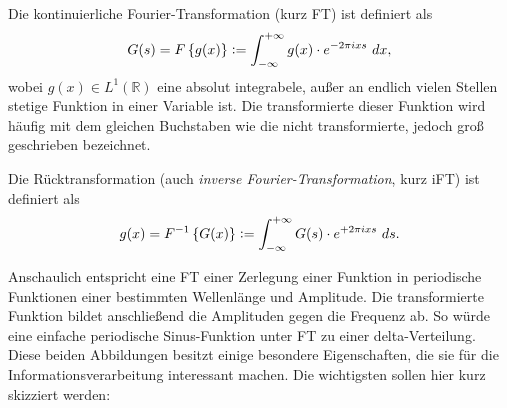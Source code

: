 
Die kontinuierliche Fourier-Transformation (kurz FT) ist definiert als
\begin{equation}
	G(s) = F\left\{g(x)\right\}\vcentcolon=\int_{-\infty}^{+\infty} g(x) \cdot e^{-2\pi i x s} ~dx ,
	\label{eq:ft}
\end{equation}
wobei $g(x)\in L^1(\mathbb{R})$ eine absolut integrabele, außer an endlich vielen Stellen stetige Funktion in einer Variable ist. Die transformierte dieser Funktion wird häufig mit dem gleichen Buchstaben wie die nicht transformierte, jedoch groß geschrieben bezeichnet.

Die Rücktransformation (auch \textit{inverse Fourier-Transformation}, kurz iFT) ist definiert als
\begin{equation}
	g(x) = F^{-1}\left\{G(x)\right\}\vcentcolon=\int_{-\infty}^{+\infty} G(s) \cdot e^{+2\pi i x s} ~ds .
	\label{eq:ift}
\end{equation}

Anschaulich entspricht eine FT einer Zerlegung einer Funktion in periodische Funktionen einer bestimmten Wellenlänge und Amplitude. Die transformierte Funktion bildet anschließend die Amplituden gegen die Frequenz ab. So würde eine einfache periodische Sinus-Funktion unter FT zu einer delta-Verteilung.\\

Diese beiden Abbildungen besitzt einige besondere Eigenschaften, die sie für die Informationsverarbeitung interessant machen. Die wichtigsten sollen hier kurz skizziert werden:

